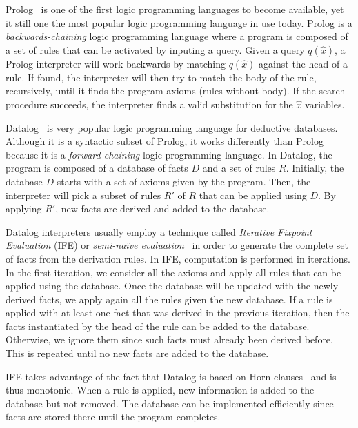 
Prolog~\cite{Colmerauer:1993:BP:154766.155362} is one of the first logic programming languages to become available, yet it still one the most popular logic programming language in use today. Prolog is a \emph{backwards-chaining} logic programming language where a program is composed of a set of rules that can be activated by inputing a query. Given a query $q(\hat{x})$, a Prolog interpreter will work backwards by matching $q(\hat{x})$ against the head of a rule. If found, the interpreter will then try to match the body of the rule, recursively, until it finds the program axioms (rules without body). If the search procedure succeeds, the interpreter finds a valid substitution for the $\hat{x}$ variables.

Datalog~\cite{Ramakrishnan93asurvey} is very popular logic programming language for deductive databases. Although it is a syntactic subset of Prolog, it works differently than Prolog because it is a \emph{forward-chaining} logic programming language. In Datalog, the program is composed of a database of facts $D$ and a set of rules $R$. Initially, the database $D$ starts with a set of axioms given by the program. Then, the interpreter will pick a subset of rules $R'$ of $R$ that can be applied using $D$. By applying $R'$, new facts are derived and added to the database.

Datalog interpreters usually employ a technique called \emph{Iterative Fixpoint Evaluation} (IFE) or \emph{semi-na\"{i}ve evaluation}~\cite{Ramakrishnan93asurvey} in order to generate the complete set of facts from the derivation rules. In IFE, computation is performed in iterations. In the first iteration, we consider all the axioms and
apply all rules that can be applied using the database. Once the database will be updated with the newly derived facts, we apply again all the rules given
the new database. If a rule is applied with at-least one fact that was derived in the previous iteration, then the facts instantiated by the head of the
rule can be added to the database. Otherwise, we ignore them since such facts must already been derived before. This is repeated until no new facts are added to the database.

IFE takes advantage of the fact that Datalog is based on Horn clauses~\cite{journals/jsyml/Horn51} and is thus monotonic. When a rule is applied, new information is added to the database but not removed. The database can be implemented efficiently since facts are stored there until the program completes.

